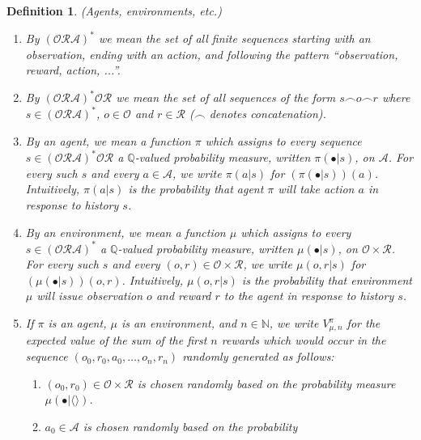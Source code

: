 \documentclass{article}
\newtheorem{definition}[theorem]{Definition}
\begin{document}
\begin{definition}
\label{omnibusdefn}
    (Agents, environments, etc.)
    \begin{enumerate}
        \item
        By $(\mathcal O\mathcal R\mathcal A)^*$ we mean the set of
        all finite sequences starting with an observation, ending with an action,
        and following the pattern ``observation, reward, action, ...''.
        \item
        By $(\mathcal O\mathcal R\mathcal A)^* \mathcal O\mathcal R$
        we mean the set of all sequences of the form $s\frown o\frown r$ where
        $s\in (\mathcal O\mathcal R\mathcal A)^*$, $o\in\mathcal O$
        and $r\in\mathcal R$ ($\frown$ denotes concatenation).
        \item
        By an \emph{agent}, we mean a function $\pi$ which assigns to every sequence
        $s\in (\mathcal O\mathcal R\mathcal A)^* \mathcal O\mathcal R$ a $\mathbb Q$-valued probability measure,
        written $\pi(\bullet|s)$, on $\mathcal A$.
        For every such $s$ and every $a\in\mathcal A$,
        we write $\pi(a|s)$ for $(\pi(\bullet|s))(a)$.
        Intuitively, $\pi(a|s)$ is the probability that agent $\pi$
        will take action $a$ in response to history $s$.
        \item
        By an \emph{environment}, we mean a function $\mu$
        which assigns to every
        $s\in (\mathcal O\mathcal R\mathcal A)^*$
        a $\mathbb Q$-valued probability measure,
        written $\mu(\bullet|s)$,
        on $\mathcal O\times\mathcal R$.
        For every such $s$ and every $(o,r)\in\mathcal O\times\mathcal R$,
        we write $\mu(o,r|s)$ for $(\mu(\bullet|s))(o,r)$.
        Intuitively, $\mu(o,r|s)$ is the probability that environment
        $\mu$ will issue observation $o$ and reward $r$ to the agent in response
        to history $s$.
        \item
        If $\pi$ is an agent, $\mu$ is an environment, and $n\in\mathbb N$,
        we write $V^\pi_{\mu,n}$ for the expected value of the sum of
        the first $n$ rewards which would occur in the sequence
        $(o_0,r_0,a_0,\ldots,o_n,r_n)$ randomly generated as follows:
        \begin{enumerate}
            \item $(o_0,r_0)\in \mathcal O\times\mathcal R$ is chosen randomly based
            on the probability measure $\mu(\bullet|\langle\rangle)$.
            \item $a_0\in\mathcal A$ is chosen randomly based on the probability

\end{enumerate}
\end{enumerate}
\end{definition}
\end{document}
